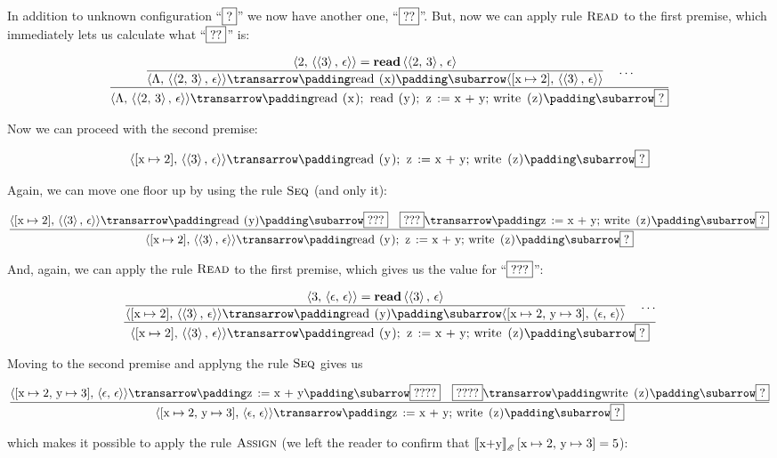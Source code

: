 In addition to unknown configuration ``$\fbox{?}$'' we now have another one, ``$\fbox{??}$''. But, now we can apply rule $\textsc{Read}$ to the
first premise, which immediately lets us calculate what ``$\fbox{??}$'' is:

\[
\trule{\trule{\inbr{2,\,\inbr{\inbr{3},\,\epsilon}}=\primi{read}{\,\inbr{\inbr{2,\,3},\,\epsilon}}}
             {\trans{\inbr{\Lambda,\,\inbr{\inbr{2,\,3},\,\epsilon}}}{\llang{read (x)}}{\inbr{[\llang{x}\mapsto 2],\,\inbr{\inbr{3},\,\epsilon}}}}\quad
       \dots}
      {\trans{\inbr{\Lambda,\,\inbr{\inbr{2,\,3},\,\epsilon}}}{\llang{read (x); read (y); z := x + y; write (z)}}{\fbox{?}}}
\]

Now we can proceed with the second premise:

\[
\trans{\inbr{[\llang{x}\mapsto 2],\,\inbr{\inbr{3},\,\epsilon}}}{\llang{read (y); z := x + y; write (z)}}{\fbox{?}}
\]

Again, we can move one floor up by using the rule $\textsc{Seq}$ (and only it):

\[
\trule{\trans{\inbr{[\llang{x}\mapsto 2],\,\inbr{\inbr{3},\,\epsilon}}}{\llang{read (y)}}{\fbox{???}}\quad\trans{\fbox{???}}{\llang{z := x + y; write (z)}}{\fbox{?}}}
      {\trans{\inbr{[\llang{x}\mapsto 2],\,\inbr{\inbr{3},\,\epsilon}}}{\llang{read (y); z := x + y; write (z)}}{\fbox{?}}}
\]

And, again, we can apply the rule $\textsc{Read}$ to the first premise, which gives us the value for ``$\fbox{???}$'':

\[
\trule{\trule{\inbr{3,\,\inbr{\epsilon,\,\epsilon}}=\primi{read}{\,\inbr{\inbr{3},\,\epsilon}}}
             {\trans{\inbr{[\llang{x}\mapsto 2],\,\inbr{\inbr{3},\,\epsilon}}}{\llang{read (y)}}{\inbr{[\llang{x}\mapsto 2,\,\llang{y}\mapsto 3],\,\inbr{\epsilon,\,\epsilon}}}}\quad
       \dots}
      {\trans{\inbr{[\llang{x}\mapsto 2],\,\inbr{\inbr{3},\,\epsilon}}}{\llang{read (y); z := x + y; write (z)}}{\fbox{?}}}
\]

Moving to the second premise and applyng the rule $\textsc{Seq}$ gives us

\[
\trule{\trans{\inbr{[\llang{x}\mapsto 2,\,\llang{y}\mapsto 3],\,\inbr{\epsilon,\,\epsilon}}}{\llang{z := x + y}}{\fbox{????}}\quad\trans{\fbox{????}}{\llang{write (z)}}{\fbox{?}}}
      {\trans{\inbr{[\llang{x}\mapsto 2,\,\llang{y}\mapsto 3],\,\inbr{\epsilon,\,\epsilon}}}{\llang{z := x + y; write (z)}}{\fbox{?}}}
\]

which makes it possible to apply the rule $\textsc{Assign}$ (we left the reader to confirm that $\sembr{\llang{x+y}}^\ph_\mathscr{E}\,[\llang{x}\mapsto 2,\,\llang{y}\mapsto 3]=5$):

